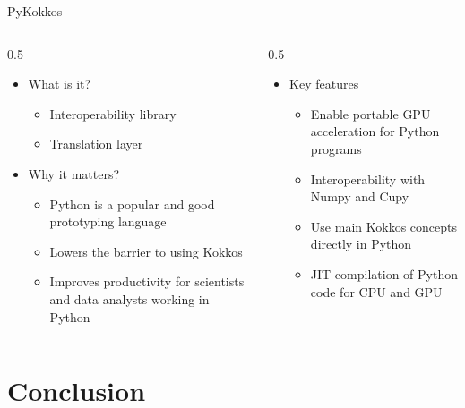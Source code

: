 \documentclass[
    aspectratio=169,
]{beamer}
\begin{document}
\begin{frame}{PyKokkos}
    \begin{columns}
        \begin{column}{0.5\linewidth}
            \begin{itemize}
                \item What is it?
                \begin{itemize}
                    \item Interoperability library
                    \item Translation layer
                \end{itemize}
                \item Why it matters?
                \begin{itemize}
                    \item Python is a popular and good prototyping language
                    \item Lowers the barrier to using Kokkos
                    \item Improves productivity for scientists and data analysts working in Python
                \end{itemize}
            \end{itemize}
        \end{column}
        \begin{column}{0.5\linewidth}
            \begin{itemize}
                \item Key features
                \begin{itemize}
                    \item Enable portable GPU acceleration for Python programs
                    \item Interoperability with Numpy and Cupy
                    \item Use main Kokkos concepts directly in Python
                    \item JIT compilation of Python code for CPU and GPU
                \end{itemize}
            \end{itemize}
        \end{column}
    \end{columns}
\end{frame}

\section{Conclusion}
\end{document}

